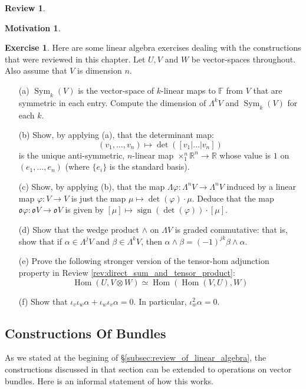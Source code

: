 \documentclass[12pt]{article}
\theoremstyle{definition}
\newtheorem{review}[theorem]{Review}
\newtheorem{exercise}[theorem]{Exercise}
\newtheorem{motivation}[theorem]{Motivation}
\numberwithin{equation}{section}
\newcommand{\R}{{\mathbb R}}
\newcommand{\op}{\operatorname}
\begin{document}
\begin{review}
\begin{motivation} 
\end{motivation} 

\begin{exercise} \label{ex:linear_algebra} Here are some linear algebra exercises dealing with the constructions that were reviewed in this chapter. Let $U,V$ and $W$ be vector-spaces throughout. Also assume that $V$ is dimension $n$.

\begin{itemize}
	\item[(a)] $\op{Sym}_k(V)$ is the vector-space of $k$-linear maps to $\mathbb{F}$ from $V$ that are symmetric in each entry. Compute the dimension of $\Lambda^k V$ and $\op{Sym}_k(V)$ for each $k$. 
	\item[(b)] Show, by applying (a), that the determinant map:
	\[(v_1,\dots,v_n) \mapsto \op{det}([v_1|\dots|v_n])\]
	is the unique anti-symmetric, $n$-linear map $\times_1^n \R^n \to \R$ whose value is $1$ on $(e_1,\dots,e_n)$ (where $\{e_i\}$ is the standard basis).
	\item[(c)] Show, by applying (b), that the map $\Lambda \varphi:\Lambda^n V \to \Lambda^n V$ induced by a linear map $\varphi:V \to V$ is just the map $\mu \mapsto \op{det}(\varphi) \cdot \mu$. Deduce that the map $\mathfrak{o}\varphi:\mathfrak{o}V \to \mathfrak{o}V$ is given by $[\mu] \mapsto \op{sign}(\op{det}(\varphi)) \cdot [\mu]$.
	\item[(d)] Show that the wedge product $\wedge$ on $\Lambda V$ is graded commutative: that is, show that if $\alpha \in \Lambda^j V$ and $\beta \in \Lambda^k V$, then $\alpha \wedge \beta = (-1)^{jk} \beta \wedge \alpha$.
	\item[(e)] Prove the following stronger version of the tensor-hom adjunction property in Review \ref{rev:direct_sum_and_tensor_product}:
	\[
	\op{Hom}(U, V \otimes W) \simeq \op{Hom}(\op{Hom}(V,U),W)
	\]
	\item[(f)] Show that $\iota_v \iota_w \alpha + \iota_w \iota_v \alpha = 0$. In particular, $\iota_w^2\alpha = 0$.
\end{itemize}
\end{exercise}

\end{review}
\subsection{Constructions Of Bundles} \label{subsec:natural_constructions_of_bundles} As we stated at the begining of \S \ref{subsec:review_of_linear_algebra}, the constructions discussed in that section can be extended to operations on vector bundles. Here is an informal statement of how this works.
\end{document}

